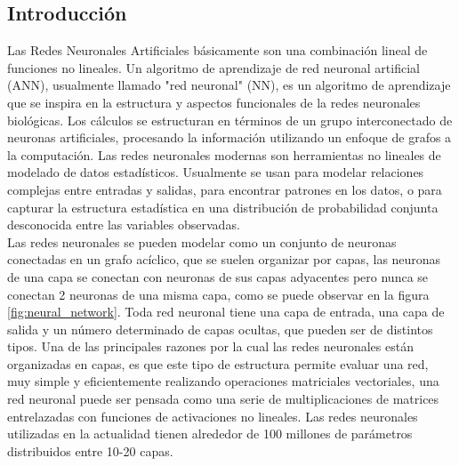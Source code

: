 \documentclass[a4paper,11pt,spanish]{book}
\begin{document}
      \subsection{Introducción}
	Las Redes Neuronales Artificiales básicamente son una combinación lineal de funciones no lineales.
	Un algoritmo de aprendizaje de red neuronal artificial (ANN), usualmente llamado "red neuronal" (NN), es un algoritmo de aprendizaje que se inspira en la estructura y aspectos funcionales
	de la redes neuronales biológicas. Los cálculos se estructuran en términos de un grupo interconectado de neuronas artificiales, procesando la información utilizando un enfoque de grafos
	a la computación. Las redes neuronales modernas son herramientas no lineales de modelado de datos estadísticos. Usualmente se usan para modelar relaciones complejas entre entradas y salidas,
	para encontrar patrones en los datos, o para capturar la estructura estadística en una distribución de probabilidad conjunta desconocida entre las variables observadas. \\
	Las redes neuronales se pueden modelar como un conjunto de neuronas conectadas en un grafo acíclico, que se suelen organizar por capas, las neuronas de una capa
	se conectan con neuronas de sus capas adyacentes pero nunca se conectan 2 neuronas de una misma capa, como se puede observar en la figura \ref{fig:neural_network}.
	Toda red neuronal tiene una capa de entrada, una capa de salida y un número determinado de capas ocultas, que pueden ser de distintos tipos.
	Una de las principales razones por la cual las redes neuronales están organizadas en capas, es que este tipo de estructura permite evaluar una red, muy simple y eficientemente realizando
	operaciones matriciales vectoriales, una red neuronal puede ser pensada como una serie de multiplicaciones de matrices entrelazadas con funciones de activaciones no lineales.
	Las redes neuronales utilizadas en la actualidad tienen alrededor de 100 millones de parámetros distribuidos entre 10-20 capas.
\end{document}
